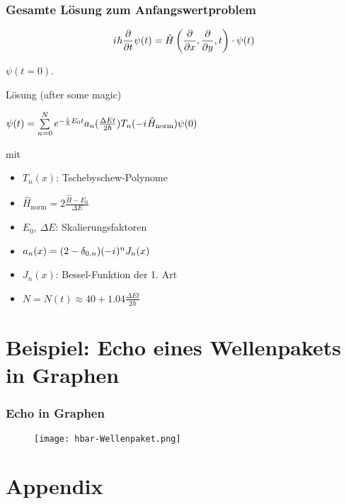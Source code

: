 \documentclass{beamer}
\newcommand{\iu}{{i\mkern1mu}} 	%
\begin{document}
\begin{frame}[t] %
  \frametitle{Gesamte Lösung zum Anfangswertproblem}
  \vskip-5mm
    \begin{equation*}
      \iu \hbar \frac{\partial}{\partial t}  \psi(t) = \hat{H}\left(\frac{\partial}{\partial x}, \frac{\partial}{\partial y}, t\right) \cdot \psi(t) 
    \end{equation*}
  
      $\psi(t=0)$.
    \begin{block}{Lösung (after some magic)}
  \begin{center}$\psi(t) = \sum\limits_{n=0}^N e^{-\frac{\iu}{\hbar}E_0 t} a_n(\frac{\Delta E t}{2\hbar}) T_n(-\iu\hat{H}_\text{norm})\psi(0)$\end{center}
    \end{block}     
  mit

    \begin{itemize}
  \item $T_n(x)$: Tschebyschew-Polynome
  \item $\hat{H}_\text{norm} = 2 \frac{\hat{H}-E_0}{\Delta E}$
  \item $E_0$, $\Delta E$: Skalierungsfaktoren 
  \item $a_n(x) = (2-\delta_{0,n})(-\iu)^n J_n(x)$
  \item $J_n(x)$: Bessel-Funktion der 1. Art
  \item $N= N(t) \approx 40 + 1.04 \frac{\Delta E t}{2\hbar}$
    \end{itemize}
\end{frame}

\section{Beispiel: Echo eines Wellenpakets in Graphen}
\begin{frame}[t]%
  \vskip-3mm
  \frametitle{Echo in Graphen}
     \begin{figure}\centering
      \texttt{[image: hbar-Wellenpaket.png]}
     \end{figure} 
 \end{frame}


 \section*{Appendix}
\end{document}
